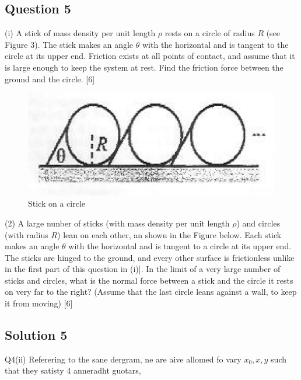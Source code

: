 \documentclass{article}
\begin{document}
\subsection{Question 5}

(i) A stick of mass density per unit length $\rho$ rests on a circle of radius $R$ (see Figure 3). The stick makes an angle $\theta$ with the horizontal and is tangent to the circle at its upper end. Friction exists at all points of contact, and assume that it is large enough to keep the system at rest. Find the friction force between the ground and the circle. [6]

\begin{figure}
	\centering
	\includegraphics[width=0.7\linewidth]{spho_book_TYS_images/2011q5.png}
	\caption{Stick on a circle}
\end{figure}
(2) A large nunber of sticks (with mass density per unit length $\rho$) and circles (with radius $R$) lean on each other, an shown in the Figure below. Each stick makes an angle $\theta$ with the horizontal and is tangent to a circle at its upper end. The sticks are hinged to the ground, and every other surface is frictionless unlike in the first part of this question in (i)]. In the limit of a very large number of sticks and circles, what is the normal force between a stick and the circle it rests on very far to the right? (Assume that the last circle leans against a wall, to keep it from moving) [6]


\subsection{Solution 5}
Q4(ii) Referering to the sane dergram, ne are aive allomed fo vary $x_{0}, x, y$ such that they satisty 4 anneradht guotars,
\end{document}
